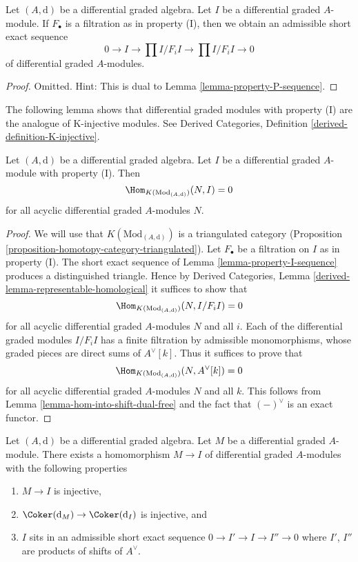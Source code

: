 \begin{lemma}
\label{lemma-property-I-sequence}
Let $(A, \text{d})$ be a differential graded algebra.
Let $I$ be a differential graded $A$-module. If $F_\bullet$
is a filtration as in property (I), then we obtain an
admissible short exact sequence
$$
0 \to I \to
\prod\nolimits I/F_iI \to
\prod\nolimits I/F_iI \to 0
$$
of differential graded $A$-modules.
\end{lemma}

\begin{proof}
Omitted. Hint: This is dual to Lemma \ref{lemma-property-P-sequence}.
\end{proof}

\noindent
The following lemma shows that differential graded modules with
property (I) are the analogue of K-injective modules. See
Derived Categories, Definition \ref{derived-definition-K-injective}.

\begin{lemma}
\label{lemma-property-I-K-injective}
Let $(A, \text{d})$ be a differential graded algebra.
Let $I$ be a differential graded $A$-module with property (I).
Then
$$
\Hom_{K(\text{Mod}_{(A, \text{d})})}(N, I) = 0
$$
for all acyclic differential graded $A$-modules $N$.
\end{lemma}

\begin{proof}
We will use that $K(\text{Mod}_{(A, \text{d})})$ is a triangulated
category (Proposition \ref{proposition-homotopy-category-triangulated}).
Let $F_\bullet$ be a filtration on $I$ as in property (I).
The short exact sequence of Lemma \ref{lemma-property-I-sequence}
produces a distinguished triangle. Hence by
Derived Categories, Lemma \ref{derived-lemma-representable-homological}
it suffices to show that
$$
\Hom_{K(\text{Mod}_{(A, \text{d})})}(N, I/F_iI) = 0
$$
for all acyclic differential graded $A$-modules $N$ and all $i$.
Each of the differential graded modules $I/F_iI$ has a finite filtration
by admissible monomorphisms, whose graded pieces are
direct sums of $A^\vee[k]$. Thus it suffices to prove that
$$
\Hom_{K(\text{Mod}_{(A, \text{d})})}(N, A^\vee[k]) = 0
$$
for all acyclic differential graded $A$-modules $N$ and all $k$.
This follows from Lemma \ref{lemma-hom-into-shift-dual-free}
and the fact that $(-)^\vee$ is an exact functor.
\end{proof}

\begin{lemma}
\label{lemma-good-sub}
Let $(A, \text{d})$ be a differential graded algebra.
Let $M$ be a differential graded $A$-module. There exists a homomorphism
$M \to I$ of differential graded $A$-modules with the following
properties
\begin{enumerate}
\item $M \to I$ is injective,
\item $\Coker(\text{d}_M) \to \Coker(\text{d}_I)$ is injective,
and
\item $I$ sits in an admissible short exact sequence
$0 \to I' \to I \to I'' \to 0$ where $I'$, $I''$ are products
of shifts of $A^\vee$.
\end{enumerate}
\end{lemma}

